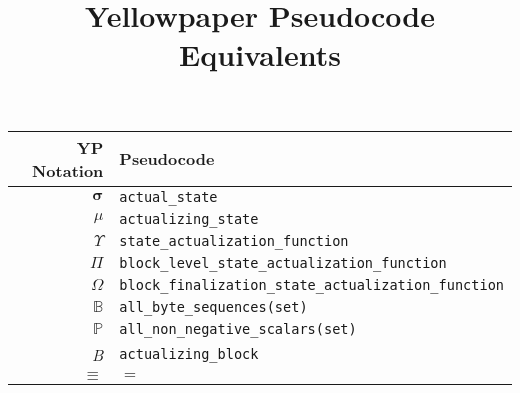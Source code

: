 \documentclass[9pt,a4paper,oneside]{scrartcl}
\author{}
\title{Yellowpaper Pseudocode Equivalents}
\date{}
\begin{document}
\maketitle
\centering
\begin{tabular}{|rl|}
	\hline
	\textbf{YP Notation} & \textbf{Pseudocode} \\
	\hline
	$\boldsymbol{\sigma}$ & \texttt{actual\_state} \\
	$\mu$ & \texttt{actualizing\_state} \\
	$\Upsilon$ & \texttt{state\_actualization\_function} \\
	$\Pi$ & \texttt{block\_level\_state\_actualization\_function} \\
	$\Omega$ & \texttt{block\_finalization\_state\_actualization\_function} \\
	$\mathbb{B}$ & \texttt{all\_byte\_sequences(set)} \\
	$\mathbb{P}$ & \texttt{all\_non\_negative\_scalars(set)} \\
	\textit{B} & \texttt{actualizing\_block} \\
	$\equiv$ & $=$ \\

	\hline
\end{tabular}


\printbibliography
\end{document}
